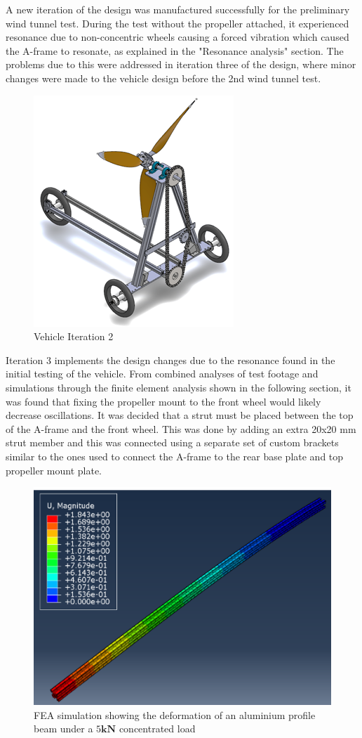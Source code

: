 A new iteration of the design was manufactured successfully for the preliminary wind tunnel test. During the test without the propeller attached, it experienced resonance due to non-concentric wheels causing a forced vibration which caused the A-frame to resonate, as explained in the "Resonance analysis" section. The problems due to this were addressed in iteration three of the design, where minor changes were made to the vehicle design before the 2nd wind tunnel test.

\begin{figure}[!htbp]
    \centering
    \includegraphics{images/part9/drivetrainIter2.png}
    \caption{Vehicle Iteration 2}
    \label{fig:dtIter2}
\end{figure}

Iteration 3 implements the design changes due to the resonance found in the initial testing of the vehicle. From combined analyses of test footage and simulations through the finite element analysis shown in the following section, it was found that fixing the propeller mount to the front wheel would likely decrease oscillations. It was decided that a strut must be placed between the top of the A-frame and the front wheel. This was done by adding an extra 20x20 mm strut member and this was connected using a separate set of custom brackets similar to the ones used to connect the A-frame to the rear base plate and top propeller mount plate.

\begin{figure}[!htbp]
    \centering
    \includegraphics[width=0.5\linewidth]{images/part8/stucturethingy.png}
    \caption{FEA simulation showing the deformation of an aluminium profile beam under a $5\mathbf{kN}$ concentrated load}
    \label{fig:structhingy}
\end{figure}

